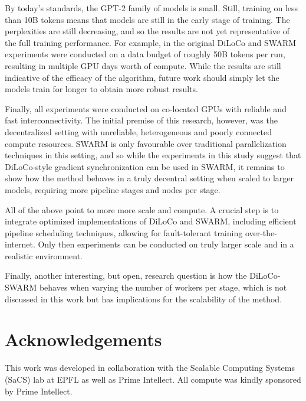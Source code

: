\documentclass{article}
\begin{document}
By today's standards, the GPT-2 family of models is small. Still, training on
less than 10B tokens means that models are still in the early stage of training.
The perplexities are still decreasing, and so the results are not yet
representative of the full training performance. For example, in the original
DiLoCo and SWARM experiments were conducted on a data budget of roughly 50B
tokens per run, resulting in multiple GPU days worth of compute. While the
results are still indicative of the efficacy of the algorithm, future work
should simply let the models train for longer to obtain more robust results.

Finally, all experiments were conducted on co-located GPUs with reliable and fast
interconnectivity. The initial premise of this research, however, was the
decentralized setting with unreliable, heterogeneous and poorly connected
compute resources. SWARM is only favourable over traditional parallelization
techniques in this setting, and so while the experiments in this study suggest
that DiLoCo-style gradient synchronization can be used in SWARM, it remains to
show how the method behaves in a truly decentral setting when scaled to larger
models, requiring more pipeline stages and nodes per stage.

All of the above point to more more scale and compute. A crucial step is to
integrate optimized implementations of DiLoCo and SWARM, including efficient
pipeline scheduling techniques, allowing for fault-tolerant training over-the-
internet. Only then experiments can be conducted on truly larger scale and in a
realistic environment.

Finally, another interesting, but open, research question is how the
DiLoCo-SWARM behaves when varying the number of workers per stage, which is not
discussed in this work but has implications for the scalability of the method.

\section*{Acknowledgements}
\label{sec:acknowledgements}

This work was developed in collaboration with the Scalable Computing Systems
(SaCS) lab at EPFL as well as Prime Intellect. All compute was kindly sponsored
by Prime Intellect.




\newpage
\appendix
\onecolumn
\end{document}
